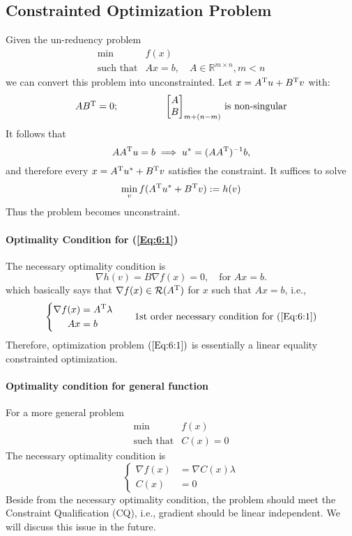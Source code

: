 \subsection{Constrainted Optimization Problem}
Given the un-reduency problem
\begin{equation}\label{Eq:6:1}
\begin{array}{ll}
\min&f(x)\\
\mbox{such that}&Ax=b,\quad A\in\mathbb{R}^{m\times n},m<n
\end{array}
\end{equation}
we can convert this problem into unconstrainted. Let $x=A^{\mathrm T} u+B^{\mathrm T} v$ with:
\[
\begin{array}{ll}
AB^{\mathrm T}=0;\qquad\qquad
&
\mbox{$\begin{bmatrix}
A\\B
\end{bmatrix}_{m+(n-m)}$ is non-singular}
\end{array}
\]
It follows that
\[
AA^{\mathrm T} u=b\implies u^*=(AA^{\mathrm T})^{-1}b,
\]
and therefore every $x=A^{\mathrm T} u^*+B^{\mathrm T} v$ satisfies the constraint. It suffices to solve
\[
\min_{v}f(A^{\mathrm T} u^*+B^{\mathrm T} v):=h(v)
\]
Thus the problem becomes unconstraint.
\paragraph{Optimality Condition for (\ref{Eq:6:1})}
 The necessary optimality condition is 
\[\nabla h(v)=
B\nabla f(x)=0,\quad\mbox{for }Ax=b.
\]
which basically says that $\nabla f(x)\in\mathcal{R}(A^{\mathrm T})$ for $x$ such that $Ax=b$, i.e.,
\[\left\{
\begin{aligned}
\nabla f(x)&=A^{\mathrm T}\lambda\\
Ax&=b
\end{aligned}
\right.\qquad
\mbox{1st order necessary condition for $(\ref{Eq:6:1})$}
\]
Therefore, optimization problem $(\ref{Eq:6:1})$ is essentially a linear equality constrainted optimization.
\paragraph{Optimality condition for general function}
For a more general problem 
\begin{equation}\label{Eq:6:2}
\begin{array}{ll}
\min&f(x)\\
\mbox{such that}&C(x)=0
\end{array}
\end{equation}
The necessary optimality condition is
\[\left\{
\begin{aligned}
\nabla f(x)&=\nabla C(x)\lambda\\
C(x)&=0
\end{aligned}
\right.
\]
Beside from the necessary optimality condition, the problem should meet the Constraint Qualification (CQ), i.e., gradient should be linear independent. We will discuss this issue in the future.

